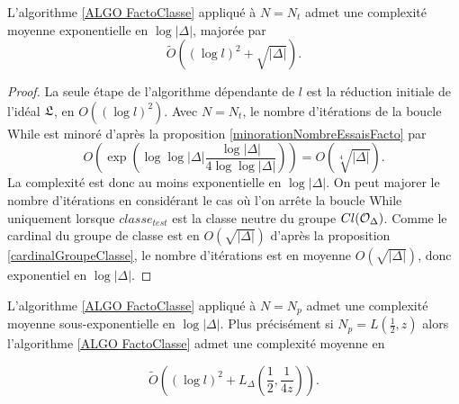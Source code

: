 \begin{Prop}\label{COMPLEX factoClasseTh}
	 L'algorithme \ref{ALGO FactoClasse} appliqué à $N = N_t$ admet une complexité moyenne exponentielle en $\log|\Delta|$, majorée par
	\begin{equation*}
		\tilde{O}\left( (\log l)^2 + \sqrt{|\Delta|}\right).
	\end{equation*}
	
\end{Prop}

\begin{proof}
	La seule étape de l'algorithme dépendante de $l$ est la réduction initiale de l'idéal $\mathfrak{L}$, en $O((\log l)^2)$. Avec $N = N_{t}$, le nombre d'itérations de la boucle While est minoré d'après la proposition \ref{minorationNombreEssaisFacto} par
	\begin{equation*}
		O\left( \exp \left(  \log\log|\Delta|   \frac{\log|\Delta|}{4\log\log|\Delta|} \right) \right) = O\left( \sqrt[4]{|\Delta|}\right).
	\end{equation*}
	La complexité est donc au moins exponentielle en $\log|\Delta|$. On peut majorer le nombre d'itérations en considérant le cas où l'on arrête la boucle While uniquement lorsque $classe_{test}$ est la classe neutre du groupe $Cl(\mathcal{O}_{\Delta})$. Comme le cardinal du groupe de classe est en $O(\sqrt{|\Delta|})$ d'après la proposition \ref{cardinalGroupeClasse}, le nombre d'itérations est en moyenne $O(\sqrt{|\Delta|})$, donc exponentiel en $\log|\Delta|$. 
	
\end{proof}


\begin{Prop}\label{COMPLEX factoClasseJao}
	L'algorithme \ref{ALGO FactoClasse} appliqué à $N = N_p$ admet une complexité moyenne sous-exponentielle en $\log|\Delta|$. Plus précisément si $N_{p} = L\left(\frac{1}{2}, z \right)$ alors l'algorithme \ref{ALGO FactoClasse} admet une complexité moyenne en
	
	\begin{equation*}
		\tilde{O}\left((\log l)^2 + L_\Delta\left(\frac{1}{2}, \frac{1}{4z} \right)\right).
	\end{equation*}
	
\end{Prop}

